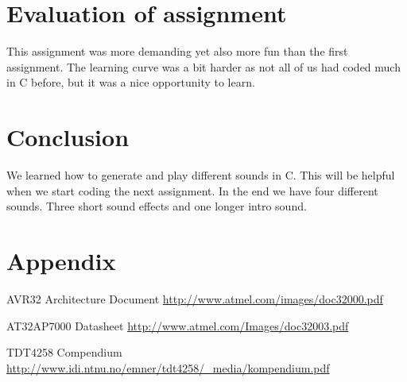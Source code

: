 \documentclass[a4paper,11pt]{article}
\begin{document}
\section{Evaluation of assignment}
This assignment was more demanding yet also more fun than the first assignment. The learning curve was a bit harder as not all of us had coded much in C before, but it was a nice opportunity to learn.

\section{Conclusion}
We learned how to generate and play different sounds in C. This will be helpful when we start coding the next assignment. In the end we have four different sounds. Three short sound effects and one longer intro sound.

\section{Appendix}

\footnotesize{  %
\begin{thebibliography}{N}

 AVR32 Architecture Document
\url{http://www.atmel.com/images/doc32000.pdf}

 AT32AP7000 Datasheet
\url{http://www.atmel.com/Images/doc32003.pdf}

 TDT4258 Compendium
\url{http://www.idi.ntnu.no/emner/tdt4258/_media/kompendium.pdf}

\end{thebibliography}  
}
\end{document}
